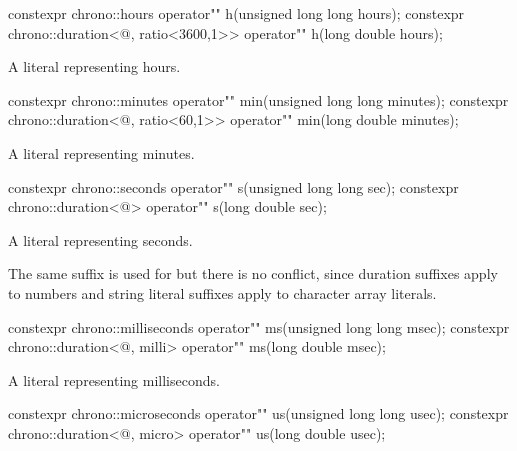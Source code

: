 \documentclass[ebook,11pt,article]{memoir}
\begin{document}
\begin{itemdecl}
constexpr 
chrono::hours operator"" h(unsigned long long hours);
constexpr 
chrono::duration<@\unspec@, ratio<3600,1>> operator"" h(long double hours);
\end{itemdecl}

\begin{itemdescr}
\pnum
\returns 
A  literal representing  hours. 
\end{itemdescr}

\begin{itemdecl}
constexpr 
chrono::minutes operator"" min(unsigned long long minutes);
constexpr 
chrono::duration<@\unspec@, ratio<60,1>> operator"" min(long double minutes);
\end{itemdecl}

\begin{itemdescr}
\pnum
\returns
A  literal representing  minutes. 
\end{itemdescr}

\begin{itemdecl}
constexpr 
chrono::seconds operator"" s(unsigned long long sec);
constexpr 
chrono::duration<@\unspec@> operator"" s(long double sec);
\end{itemdecl}

\begin{itemdescr}
\pnum
\returns
A  literal representing  seconds. 

\enternote
The same suffix  is used for  but there is no conflict, since duration suffixes apply to numbers and string literal suffixes apply to character array literals.
\exitnote
\end{itemdescr}

\begin{itemdecl}
constexpr 
chrono::milliseconds operator"" ms(unsigned long long msec);
constexpr 
chrono::duration<@\unspec@, milli> operator"" ms(long double msec);
\end{itemdecl}

\begin{itemdescr}
\pnum
\returns
A  literal representing  milliseconds. 
\end{itemdescr}

\begin{itemdecl}
constexpr 
chrono::microseconds operator"" us(unsigned long long usec);
constexpr 
chrono::duration<@\unspec@, micro> operator"" us(long double usec);
\end{itemdecl}
\end{document}
